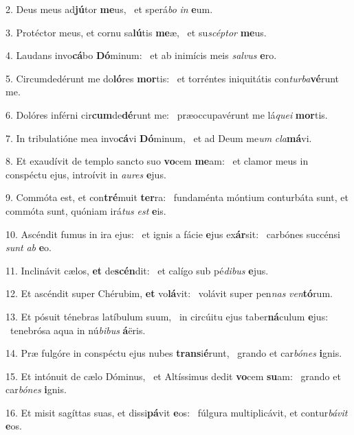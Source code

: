 2. Deus meus ad\textbf{jú}tor \textbf{me}us, \ast\  et sperá\textit{bo} \textit{in} \textbf{e}um.\

3. Protéctor meus, et cornu sa\textbf{lú}tis \textbf{me}æ, \ast\  et su\textit{scép}\textit{tor} \textbf{me}us.\

4. Laudans invo\textbf{cá}bo \textbf{Dó}minum: \ast\  et ab inimícis meis \textit{sal}\textit{vus} \textbf{e}ro.\

5. Circumdedérunt me do\textbf{ló}res \textbf{mor}tis: \ast\  et torréntes iniquitátis con\textit{tur}\textit{ba}\textbf{vé}runt me.\

6. Dolóres inférni cir\textbf{cum}de\textbf{dé}runt me: \ast\  præoccupavérunt me lá\textit{que}\textit{i} \textbf{mor}tis.\

7. In tribulatióne mea invo\textbf{cá}vi \textbf{Dó}minum, \ast\  et ad Deum me\textit{um} \textit{cla}\textbf{má}vi.\

8. Et exaudívit de templo sancto suo \textbf{vo}cem \textbf{me}am: \ast\  et clamor meus in conspéctu ejus, introívit in \textit{au}\textit{res} \textbf{e}jus.\

9. Commóta est, et con\textbf{tré}muit \textbf{ter}ra: \ast\  fundaménta móntium conturbáta sunt, et commóta sunt, quóniam irá\textit{tus} \textit{est} \textbf{e}is.\

10. Ascéndit fumus in ira ejus: \dag\  et ignis a fácie \textbf{e}jus ex\textbf{ár}sit: \ast\  carbónes succénsi \textit{sunt} \textit{ab} \textbf{e}o.\

11. Inclinávit cælos, \textbf{et} de\textbf{scén}dit: \ast\  et calígo sub pé\textit{di}\textit{bus} \textbf{e}jus.\

12. Et ascéndit super Chérubim, \textbf{et} vo\textbf{lá}vit: \ast\  volávit super pen\textit{nas} \textit{ven}\textbf{tó}rum.\

13. Et pósuit ténebras latíbulum suum, \dag\  in circúitu ejus taber\textbf{ná}culum \textbf{e}jus: \ast\  tenebrósa aqua in nú\textit{bi}\textit{bus} \textbf{á}ëris.\

14. Præ fulgóre in conspéctu ejus nubes \textbf{trans}i\textbf{é}runt, \ast\  grando et car\textit{bó}\textit{nes} \textbf{i}gnis.\

15. Et intónuit de cælo Dóminus, \dag\  et Altíssimus dedit \textbf{vo}cem \textbf{su}am: \ast\  grando et car\textit{bó}\textit{nes} \textbf{i}gnis.\

16. Et misit sagíttas suas, et dissi\textbf{pá}vit \textbf{e}os: \ast\  fúlgura multiplicávit, et contur\textit{bá}\textit{vit} \textbf{e}os.\

